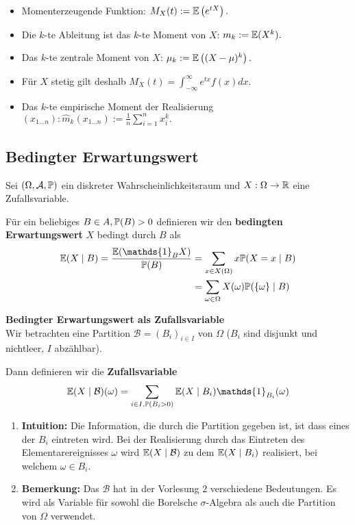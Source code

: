 \begin{subbox}{}
    \begin{itemize}
        \item Momenterzeugende Funktion: $M_X(t):=\E\left(e^{tX}\right).$ 
        \item Die $k$-te Ableitung ist das $k$-te Moment von $X$: $m_k := \E(X^k).$ 
        \item Das $k$-te zentrale Moment von $X$: $\mu_k := \E\left((X-\mu)^k\right).$ 
        \item Für $X$ stetig gilt deshalb $M_X(t) = \int_{-\infty}^\infty e^{tx} f(x) dx.$ 
        \item Das $k$-te empirische Moment der Realisierung $(x_{1\dots n}): \hat m_k(x_{1\dots n}) := \frac1n \sum_{i=1}^n x_i^k.$ 
    \end{itemize}
    
\end{subbox}

\subsection{Bedingter Erwartungswert}
Sei $(\Omega, \A, \P)$ ein diskreter Wahrscheinlichkeitsraum und $X:\Omega \to \R$ eine Zufallsvariable. 

Für ein beliebiges $B \in A, \P(B) > 0$ definieren wir den \textbf{bedingten Erwartungswert} $X$ bedingt durch $B$ als
\begin{align*}
    \E(X \mid B) = \frac{\E(\mathds{1}_B X)}{\P(B)} &= \sum_{x \in X(\Omega)}x\P(X = x\mid B)\\ 
    &= \sum_{\omega \in \Omega}X(\omega)\P(\{\omega\}\mid B)
\end{align*}

\textbf{Bedingter Erwartungswert als Zufallsvariable}\\
Wir betrachten eine Partition $\mathcal{B} = (B_i)_{i \in I}$ von $\Omega$ ($B_i$ sind disjunkt und nichtleer, $I$ abzählbar). 

Dann definieren wir die \textbf{Zufallsvariable}
$$\E(X \mid \mathcal{B})(\omega) = \sum_{i \in I, \P(B_i > 0)} \E(X \mid B_i) \mathds{1}_{B_i}(\omega)$$ 
\begin{enumerate}
    \item \textbf{Intuition:} Die Information, die durch die Partition gegeben ist, ist dass eines der $B_i$ eintreten wird. Bei der Realisierung durch das Eintreten des Elementarereignisses $\omega$ wird $\E(X \mid \mathcal{B})$ zu dem $\E(X \mid B_i)$ realisiert, bei welchem $\omega \in B_i$.
    \item \textbf{Bemerkung:} Das $\mathcal{B}$ hat in der Vorlesung 2 verschiedene Bedeutungen. Es wird als Variable für sowohl die Borelsche $\sigma$-Algebra als auch die Partition von $\Omega$ verwendet.
\end{enumerate}

